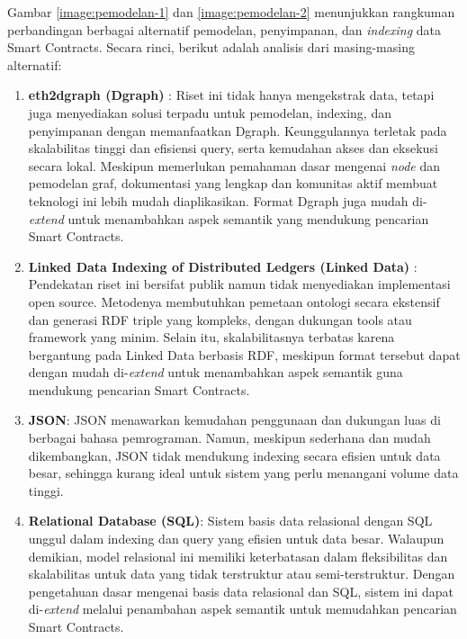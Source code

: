 Gambar \ref{image:pemodelan-1} dan \ref{image:pemodelan-2} menunjukkan rangkuman perbandingan berbagai alternatif pemodelan, penyimpanan, dan \textit{indexing} data Smart Contracts. Secara rinci, berikut adalah analisis dari masing-masing alternatif:

\begin{enumerate}
	\item \textbf{eth2dgraph (Dgraph)} \parencite{aimar2023extraction}: Riset ini tidak hanya mengekstrak data, tetapi juga menyediakan solusi terpadu untuk pemodelan, indexing, dan penyimpanan dengan memanfaatkan Dgraph. Keunggulannya terletak pada skalabilitas tinggi dan efisiensi query, serta kemudahan akses dan eksekusi secara lokal. Meskipun memerlukan pemahaman dasar mengenai \textit{node} dan pemodelan graf, dokumentasi yang lengkap dan komunitas aktif membuat teknologi ini lebih mudah diaplikasikan. Format Dgraph juga mudah di-\textit{extend} untuk menambahkan aspek semantik yang mendukung pencarian Smart Contracts.

	\item \textbf{Linked Data Indexing of Distributed Ledgers (Linked Data)} \parencite{third2017linked}: Pendekatan riset ini bersifat publik namun tidak menyediakan implementasi open source. Metodenya membutuhkan pemetaan ontologi secara ekstensif dan generasi RDF triple yang kompleks, dengan dukungan tools atau framework yang minim. Selain itu, skalabilitasnya terbatas karena bergantung pada Linked Data berbasis RDF, meskipun format tersebut dapat dengan mudah di-\textit{extend} untuk menambahkan aspek semantik guna mendukung pencarian Smart Contracts.

	\item \textbf{JSON}: JSON menawarkan kemudahan penggunaan dan dukungan luas di berbagai bahasa pemrograman. Namun, meskipun sederhana dan mudah dikembangkan, JSON tidak mendukung indexing secara efisien untuk data besar, sehingga kurang ideal untuk sistem yang perlu menangani volume data tinggi.

	\item \textbf{Relational Database (SQL)}: Sistem basis data relasional dengan SQL unggul dalam indexing dan query yang efisien untuk data besar. Walaupun demikian, model relasional ini memiliki keterbatasan dalam fleksibilitas dan skalabilitas untuk data yang tidak terstruktur atau semi-terstruktur. Dengan pengetahuan dasar mengenai basis data relasional dan SQL, sistem ini dapat di-\textit{extend} melalui penambahan aspek semantik untuk memudahkan pencarian Smart Contracts.
\end{enumerate}